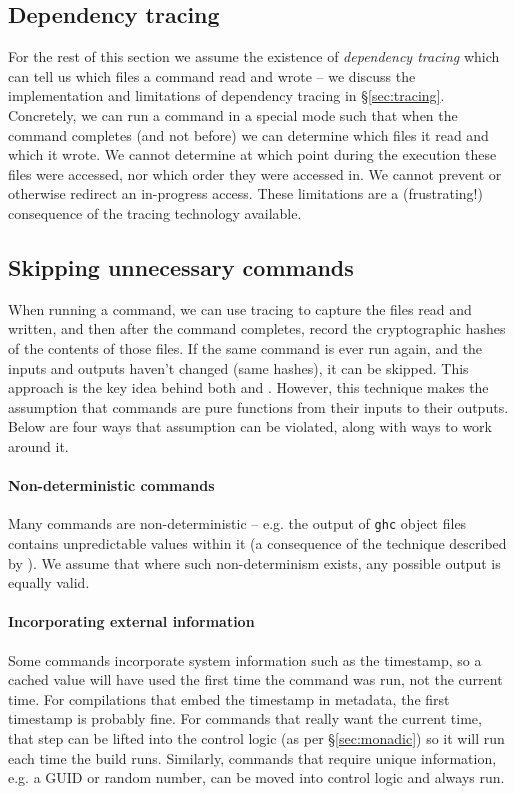 \subsection{Dependency tracing}
\label{sec:assume_tracing}

For the rest of this section we assume the existence of \emph{dependency tracing} which can tell us which files a command read and wrote -- we discuss the implementation and limitations of dependency tracing in \S\ref{sec:tracing}. Concretely, we can run a command in a special mode such that when the command completes (and not before) we can determine which files it read and which it wrote. We cannot determine at which point during the execution these files were accessed, nor which order they were accessed in. We cannot prevent or otherwise redirect an in-progress access. These limitations are a (frustrating!) consequence of the tracing technology available.

\subsection{Skipping unnecessary commands}
\label{sec:skipping_unnecessary}

When running a command, we can use tracing to capture the files read and written, and then after the command completes, record the cryptographic hashes of the contents of those files. If the same command is ever run again, and the inputs and outputs haven't changed (same hashes), it can be skipped. This approach is the key idea behind both \Memoize\cite{memoize} and \Fabricate\cite{fabricate}. However, this technique makes the assumption that commands are pure functions from their inputs to their outputs. Below are four ways that assumption can be violated, along with ways to work around it.

\paragraph{Non-deterministic commands} Many commands are non-deterministic -- e.g. the output of \texttt{ghc} object files contains unpredictable values within it (a consequence of the technique described by \citet{lennart:unique_names}). We assume that where such non-determinism exists, any possible output is equally valid.

\paragraph{Incorporating external information} Some commands incorporate system information such as the timestamp, so a cached value will have used the first time the command was run, not the current time. For compilations that embed the timestamp in metadata, the first timestamp is probably fine. For commands that really want the current time, that step can be lifted into the control logic (as per \S\ref{sec:monadic}) so it will run each time the build runs. Similarly, commands that require unique information, e.g. a GUID or random number, can be moved into control logic and always run.

